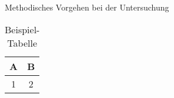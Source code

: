 \begin{section}{Methodisches Vorgehen bei der Untersuchung}
\begin{table}[h]
    \centering
    \begin{tabular}{|c|c|}
        \hline
        A & B \\
        \hline
        1 & 2 \\
        \hline
    \end{tabular}
    \caption{Beispiel-Tabelle}
    \label{tab:Beispiel-Tabelle}
\end{table}
\end{section}
